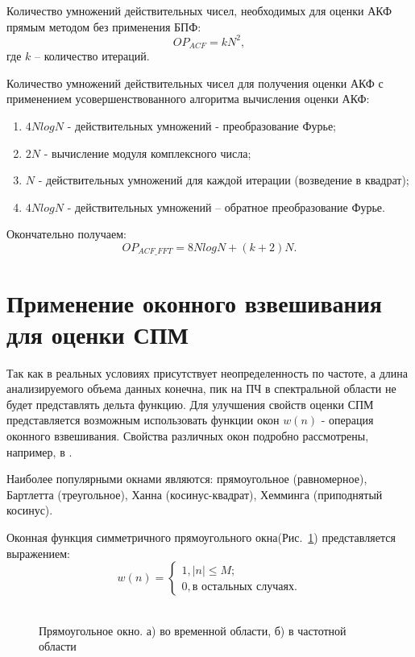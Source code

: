Количество умножений действительных чисел, необходимых для оценки АКФ прямым методом без применения БПФ: 
\begin{equation}
	\label{eq:num_of_op_acf}
	OP_{ACF}=kN^2,
\end{equation}
где ${k}$  – количество итераций.

Количество умножений действительных чисел для получения оценки АКФ с применением усовершенствованного алгоритма вычисления оценки АКФ:
\begin{enumerate}
\item ${4NlogN}$ - действительных умножений - преобразование Фурье;
\item ${2N}$ - вычисление модуля комплексного числа;
\item ${N}$ - действительных умножений для каждой итерации (возведение в квадрат);
\item ${4NlogN}$ - действительных умножений – обратное преобразование Фурье. 
\end{enumerate}

Окончательно получаем:
\begin{equation}
	\label{eq:num_of_op_acf}
	OP_{ACF\_FFT}=8NlogN + (k+2)N.
\end{equation}

\section{Применение оконного взвешивания для оценки СПМ}

Так как в реальных условиях присутствует неопределенность по частоте, а длина анализируемого объема данных конечна, пик на ПЧ в спектральной области не будет
представлять дельта функцию. Для улучшения свойств оценки СПМ представляется возможным использовать функции окон ${w(n)}$ - операция оконного взвешивания.
Свойства различных окон подробно рассмотрены, например, в \cite{shahtarin-spectrum-book, bolshakov-book}.

Наиболее популярными окнами являются: прямоугольное (равномерное), Бартлетта (треугольное), Ханна (косинус-квадрат), Хемминга (приподнятый косинус).

Оконная функция симметричного прямоугольного окна(\mbox{Рис. \ref{pic:win_rect}}) представляется выражением:
\begin{equation}
	\label{eq:rect_window}
	 w(n) = \begin{cases}
		1, |n| \le M; \\
		0, \mbox{в остальных случаях}.
		\end{cases}
\end{equation}
\begin{figure}[h]
	\center{}
	\caption{\\Прямоугольное окно. а) во временной области, б) в частотной области}
	\label{pic:win_rect}
\end{figure}

